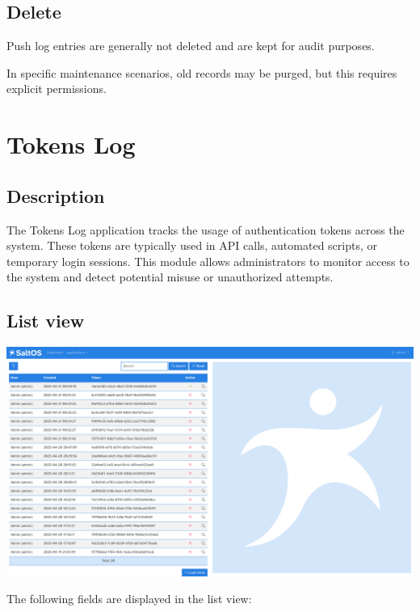 \documentclass[a4paper]{article}
\begin{document}
\hypertarget{toc25}{}
\subsection{Delete}

Push log entries are generally not deleted and are kept for audit purposes.

In specific maintenance scenarios, old records may be purged, but this requires explicit permissions.


\hypertarget{toc26}{}
\section{Tokens Log}

\hypertarget{toc27}{}
\subsection{Description}

The Tokens Log application tracks the usage of authentication tokens across the system.
These tokens are typically used in API calls, automated scripts, or temporary login sessions.
This module allows administrators to monitor access to the system and detect potential misuse or unauthorized attempts.

\hypertarget{toc28}{}
\subsection{List view}

\begin{center}\includegraphics[width=1\textwidth]{../ujest/snaps/test-screenshots-js-screenshots-common-tokenslog-list-en-us-1-snap.png}\end{center}

The following fields are displayed in the list view:
\end{document}
